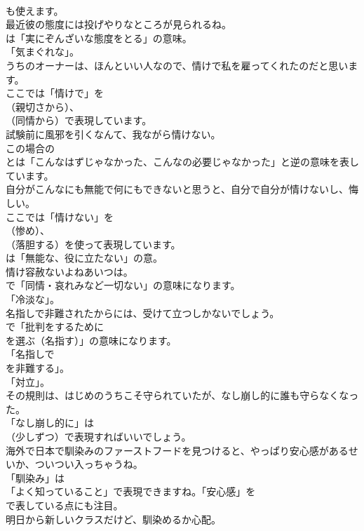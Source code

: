 \documentclass[8pt]{extreport}
\begin{document}
\begin{CJK}{UTF8}{min}
\\	も使えます。	
\\	最近彼の態度には投げやりなところが見られるね。 
\\	は「実にぞんざいな態度をとる」の意味。
\\	「気まぐれな」。	
\\	うちのオーナーは、ほんといい人なので、情けで私を雇ってくれたのだと思います。 
\\	ここでは「情けで」を 
\\	（親切さから）、
\\	（同情から）で表現しています。	
\\	試験前に風邪を引くなんて、我ながら情けない。 
\\	この場合の
\\	とは「こんなはずじゃなかった、こんなの必要じゃなかった」と逆の意味を表しています。 
\\	自分がこんなにも無能で何にもできないと思うと、自分で自分が情けないし、悔しい。 
\\	ここでは「情けない」を 
\\	（惨め）、
\\	（落胆する）を使って表現しています。
\\	は「無能な、役に立たない」の意。	
\\	情け容赦ないよねあいつは。 
\\	で「同情・哀れみなど一切ない」の意味になります。
\\	「冷淡な」。	
\\	名指しで非難されたからには、受けて立つしかないでしょう。 
\\	で「批判をするために 
\\	を選ぶ（名指す）」の意味になります。
\\	「名指しで 
\\	を非難する」。
\\	「対立」。	
\\	その規則は、はじめのうちこそ守られていたが、なし崩し的に誰も守らなくなった。 
\\	「なし崩し的に」は
\\	（少しずつ）で表現すればいいでしょう。	
\\	海外で日本で馴染みのファーストフードを見つけると、やっぱり安心感があるせいか、ついつい入っちゃうね。 
\\	「馴染み」は
\\	「よく知っていること」で表現できますね。「安心感」を
\\	で表している点にも注目。	
\\	明日から新しいクラスだけど、馴染めるか心配。 

\end{CJK}
\end{document}
